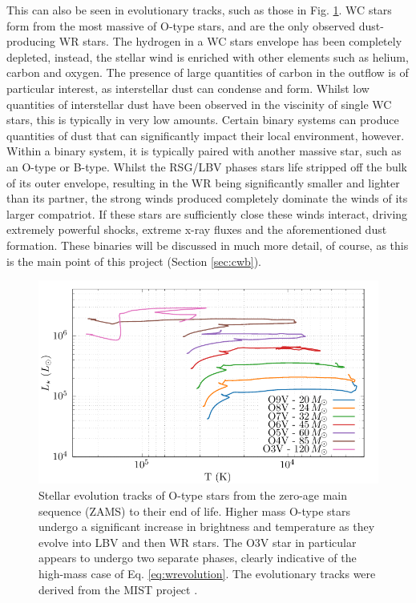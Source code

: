 \noindent
This can also be seen in evolutionary tracks, such as those in Fig. \ref{fig:mist-zams}.
WC stars form from the most massive of O-type stars, and are the only observed dust-producing WR stars.
The hydrogen in a WC stars envelope has been completely depleted, instead, the stellar wind is enriched with other elements such as helium, carbon and oxygen.
The presence of large quantities of carbon in the outflow is of particular interest, as interstellar dust can condense and form.
Whilst low quantities of interstellar dust have been observed in the viscinity of single WC stars, this is typically in very low amounts.
Certain binary systems can produce quantities of dust that can significantly impact their local environment, however.
Within a binary system, it is typically paired with another massive star, such as an O-type or B-type.
Whilst the RSG/LBV phases stars life stripped off the bulk of its outer envelope, resulting in the WR being significantly smaller and lighter than its partner, the strong winds produced completely dominate the winds of its larger compatriot.
If these stars are sufficiently close these winds interact, driving extremely powerful shocks, extreme x-ray fluxes and the aforementioned dust formation.
These binaries will be discussed in much more detail, of course, as this is the main point of this project (Section \ref{sec:cwb}).

\begin{figure}[ht]
  \centering
  \includegraphics{assets/tracks/tracks.pdf}
  \caption[Stellar evolution tracks of massive stars]{Stellar evolution tracks of O-type stars from the zero-age main sequence (ZAMS) to their end of life. Higher mass O-type stars undergo a significant increase in brightness and temperature as they evolve into LBV and then WR stars. The O3V star in particular appears to undergo two separate phases, clearly indicative of the high-mass case of Eq. \ref{eq:wrevolution}. The evolutionary tracks were derived from the MIST project \parencite{choiMesaIsochronesStellar2016,dotterMESAIsochronesStellar2016,paxtonModulesExperimentsStellar2011}.}
  \label{fig:mist-zams}
\end{figure}

